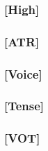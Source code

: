 \documentclass[10pt,letterpaper]{article}
\begin{document}
\subsubsection{[High]}
\label{ssub:feature_high}

\subsubsection{[ATR]}
\label{ssub:feature_atr}

\subsubsection{[Voice]}
\label{ssub:feature_voice}

\subsubsection{[Tense]}
\label{ssub:feature_tense}

\subsubsection{[VOT]}
\label{ssub:feature_vot}
\end{document}
